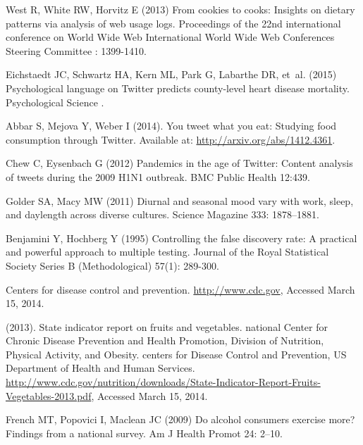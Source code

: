 \documentclass[10pt]{article}
\begin{document}
\begin{thebibliography}{10}
West R, White RW, Horvitz E (2013) From cookies to cooks: {I}nsights on dietary
  patterns via analysis of web usage logs.
\newblock Proceedings of the 22nd international conference on World Wide Web
  International World Wide Web Conferences Steering Committee : 1399-1410.

Eichstaedt JC, Schwartz HA, Kern ML, Park G, Labarthe DR, et~al. (2015)
  Psychological language on {T}witter predicts county-level heart disease
  mortality.
\newblock Psychological Science .

Abbar S, Mejova Y, Weber I (2014).
\newblock You tweet what you eat: {S}tudying food consumption through
  {T}witter.
\newblock Available at: \url{http://arxiv.org/abs/1412.4361}.

Chew C, Eysenbach G (2012) Pandemics in the age of {T}witter: {C}ontent
  analysis of tweets during the 2009 {H}1{N}1 outbreak.
\newblock BMC Public Health 12:439.

Golder SA, Macy MW (2011) Diurnal and seasonal mood vary with work, sleep, and
  daylength across diverse cultures.
\newblock Science Magazine 333: 1878--1881.

Benjamini Y, Hochberg Y (1995) Controlling the false discovery rate: {A}
  practical and powerful approach to multiple testing.
\newblock Journal of the Royal Statistical Society Series B (Methodological)
  57(1): 289-300.

Centers for disease control and prevention.
\newblock \url{http://www.cdc.gov}, Accessed March 15, 2014.

 (2013).
\newblock State indicator report on fruits and vegetables. national {C}enter
  for {C}hronic {D}isease {P}revention and {H}ealth {P}romotion, {D}ivision of
  {N}utrition, {P}hysical {A}ctivity, and {O}besity. centers for {D}isease
  {C}ontrol and {P}revention, {U}{S} {D}epartment of {H}ealth and {H}uman
  {S}ervices.
\newblock
  \url{http://www.cdc.gov/nutrition/downloads/State-Indicator-Report-Fruits-Vegetables-2013.pdf},
  Accessed March 15, 2014.

French MT, Popovici I, Maclean JC (2009) Do alcohol consumers exercise more?
  {F}indings from a national survey.
\newblock Am J Health Promot 24: 2--10.


\end{thebibliography}
\end{document}
